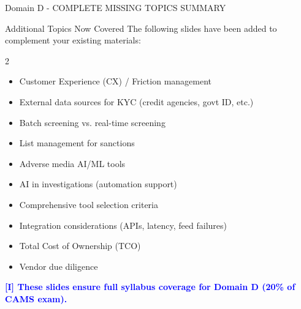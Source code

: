 \documentclass[11pt,a4paper]{beamer}
\newcommand{\bluenote}[1]{\textcolor{blue}{\textbf{[I] #1}}}
\begin{document}
\begin{frame}{Domain D - COMPLETE MISSING TOPICS SUMMARY}
	\begin{block}{Additional Topics Now Covered}
		The following slides have been added to complement your existing materials:
	\end{block}
	\begin{multicols}{2}
		\begin{itemize}
			\item Customer Experience (CX) / Friction management
			\item External data sources for KYC (credit agencies, govt ID, etc.)
			\item Batch screening vs. real-time screening
			\item List management for sanctions
			\item Adverse media AI/ML tools
			\item AI in investigations (automation support)
			\item Comprehensive tool selection criteria
			\item Integration considerations (APIs, latency, feed failures)
			\item Total Cost of Ownership (TCO)
			\item Vendor due diligence
		\end{itemize}
	\end{multicols}
	\vspace{0.3cm}
	\bluenote{These slides ensure full syllabus coverage for Domain D (20\% of CAMS exam).}
\end{frame}

\end{document}
